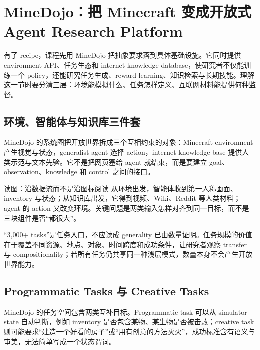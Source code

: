 \section{MineDojo：把 Minecraft 变成开放式 Agent Research Platform}

有了 recipe，课程先用 MineDojo 把抽象要求落到具体基础设施。它同时提供 environment API、任务生态和 internet knowledge database，使研究者不仅能训练一个 policy，还能研究任务生成、reward learning、知识检索与长期技能。理解这一节时要分清三层：环境能模拟什么、任务怎样定义、互联网材料能提供何种监督。

\subsection{环境、智能体与知识库三件套}

MineDojo 的系统图把开放世界拆成三个互相约束的对象：Minecraft environment 产生视觉与状态，generalist agent 选择 action，internet knowledge base 提供人类示范与文本先验。它不是把网页塞给 agent 就结束，而是要建立 goal、observation、knowledge 和 control 之间的接口。


\begin{knowledgebox}{读图：沿数据流而不是沿图标阅读}
从环境出发，智能体收到第一人称画面、inventory 与状态；从知识库出发，它得到视频、Wiki、Reddit 等人类材料；agent 的 action 又改变环境。关键问题是两类输入怎样对齐到同一目标，而不是三块组件是否“都很大”。
\end{knowledgebox}


“3,000+ tasks”是任务入口，不应读成 generality 已由数量证明。任务规模的价值在于覆盖不同资源、地点、对象、时间跨度和成功条件，让研究者观察 transfer 与 compositionality；若所有任务仍共享同一种浅层模式，数量本身不会产生开放世界能力。

\subsection{Programmatic Tasks 与 Creative Tasks}

MineDojo 的任务空间包含两类互补目标。Programmatic task 可以从 simulator state 自动判断，例如 inventory 是否包含某物、某生物是否被击败；creative task 则可能要求“建造一个好看的房子”或“用有创意的方法灭火”，成功标准含有语义与审美，无法简单写成一个状态谓词。

